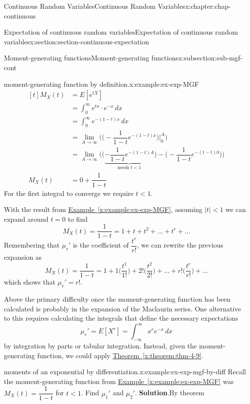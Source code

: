 \documentclass[oneside,10pt,]{book}
\newcommand{\blocktitlefont}{\relax}
\newcommand{\xreffont}{\relax}
\newcommand{\lt}{<}
\newcommand{\amp}{&}
\begin{document}
\begin{chapterptx}{Continuous Random Variables}{}{Continuous Random Variables}{}{}{x:chapter:chap-continuous}
\begin{sectionptx}{Expectation of continuous random variables}{}{Expectation of continuous random variables}{}{}{x:section:section-continuous-expectation}
\begin{subsectionptx}{Moment-generating functions}{}{Moment-generating functions}{}{}{x:subsection:sub-mgf-cont}
\begin{example}{moment-generating function by definition.}{x:example:ex-exp-MGF}
\begin{equation*}
\begin{aligned}[t]
M_X(t) \amp = E[e^{tX}]\\
\amp = \int_{0}^\infty e^{tx}\cdot e^{-x}\,dx\\
\amp = \int_{0}^\infty e^{-(1-t)x}\,dx\\
\amp =
\lim_{A\to\infty}\Big(\Big(-\dfrac{1}{1-t}e^{-(1-t)x}\Big)\Big|_0^A\Big)
\\
\amp =
\lim_{A\to\infty}\Big(\Big(\underbrace{-\dfrac{1}{1-t}e^{-(1-t)A}}_{\text{needs }t \lt 1}\Big) - \Big(-\dfrac{1}{1-t}e^{-(1-t)0}\Big)\Big)\\
M_X(t) \amp = 0 + \dfrac{1}{1-t}
\end{aligned}
\end{equation*}
For the first integral to converge we require \(t \lt 1\).\end{example}
With the result from \hyperref[x:example:ex-exp-MGF]{Example~{\xreffont\ref{x:example:ex-exp-MGF}}}, assuming \(|t| \lt 1\) we can expand around \(t=0\) to find%
\begin{equation*}
M_X(t) = \dfrac{1}{1-t} = 1
+ t + t^2 + \dots + t^r +
\dots
\end{equation*}
Remembering that \(\mu_r'\) is the coefficient of \(\dfrac{t^r}{r!}\), we can rewrite the previous expansion as%
\begin{equation*}
M_X(t) = \dfrac{1}{1-t} = 1 + 1\Big(\dfrac{t^1}{1!}\Big) +
2!\Big(\dfrac{t^2}{2!}\Big) + \dots + r!\Big(\dfrac{t^r}{r!}\Big) +
\dots
\end{equation*}
which shows that \(\mu_r' = r!\).%
\par
Above the primary difficulty once the moment-generating function has been calculated is probably in the expansion of the Maclaurin series. One alternative to this requires calculating the integrals that define the necessary expectations%
\begin{equation*}
\mu_r' = E[X^r] = \int_{-\infty}^\infty
x^r e^{-x}\,dx
\end{equation*}
by integration by parts or tabular integration. Instead, given the moment-generating function, we could apply \hyperref[x:theorem:thm-4-9]{Theorem~{\xreffont\ref{x:theorem:thm-4-9}}}.%
\begin{example}{moments of an exponential by differentiation.}{x:example:ex-exp-mgf-by-diff}%
Recall the moment-generating function from \hyperref[x:example:ex-exp-MGF]{Example~{\xreffont\ref{x:example:ex-exp-MGF}}} was \(M_X(t) = \dfrac{1}{1-t}\) for \(t \lt 1\). Find \(\mu_1'\) and \(\mu_2'\).%
\textbf{\blocktitlefont Solution}.\quad{}By theorem%

\end{example}
\end{subsectionptx}
\end{sectionptx}
\end{chapterptx}
\end{document}
